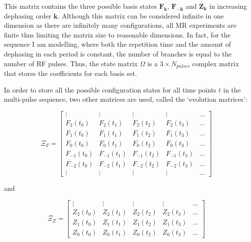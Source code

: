 \hfill

This matrix contains the three possible basis states $\bm{F_k}$, $\bm{F_{-k}}$ and $\bm{Z_k}$ in increasing dephasing order $\bm{k}$.
Although this matrix can be considered infinite in one dimension as there are infinitely many configurations, all MR experiments are finite thus limiting the matrix size to reasonable dimensions.
In fact, for the sequence I am modelling, where both the repetition time and the amount of dephasing in each period is constant, the number of branches is equal to the number of RF pulses.
Thus, the state matrix $\Omega$ is a $3 \times N_{pulses}$ complex matrix that stores the coefficients for each basis set.

\hfill

In order to store all the possible configuration states for all time points $t$ in the multi-pulse sequence, two other matrices are used, called the `evolution matrices':

\begin{equation}
    \Xi_F = 
    \begin{bmatrix}
    \vdots & \vdots & \vdots & \vdots & \dots \\
    F_2(t_0) & F_2(t_1) & F_2(t_2) & F_2(t_3) & \dots \\
    F_1(t_0) & F_1(t_1) & F_1(t_2) & F_1(t_3) & \dots \\
    F_0(t_0) & F_0(t_1) & F_0(t_2) & F_0(t_3) & \dots \\
    F_{-1}(t_0) & F_{-1}(t_1) & F_{-1}(t_2) & F_{-1}(t_3) & \dots \\
    F_{-2}(t_0) & F_{-2}(t_1) & F_{-2}(t_2) & F_{-2}(t_3) & \dots \\
    \vdots & \vdots & \vdots & \vdots & \dots 
    \end{bmatrix}
\end{equation}

and

\begin{equation}
    \Xi_Z = 
    \begin{bmatrix}
    \vdots & \vdots & \vdots & \vdots & \dots \\
    Z_2(t_0) & Z_2(t_1) & Z_2(t_2) & Z_2(t_3) & \dots \\
    Z_1(t_0) & Z_1(t_1) & Z_1(t_2) & Z_1(t_3) & \dots \\
    Z_0(t_0) & Z_0(t_1) & Z_0(t_2) & Z_0(t_3) & \dots 
    \end{bmatrix}
\end{equation}

\hfill

